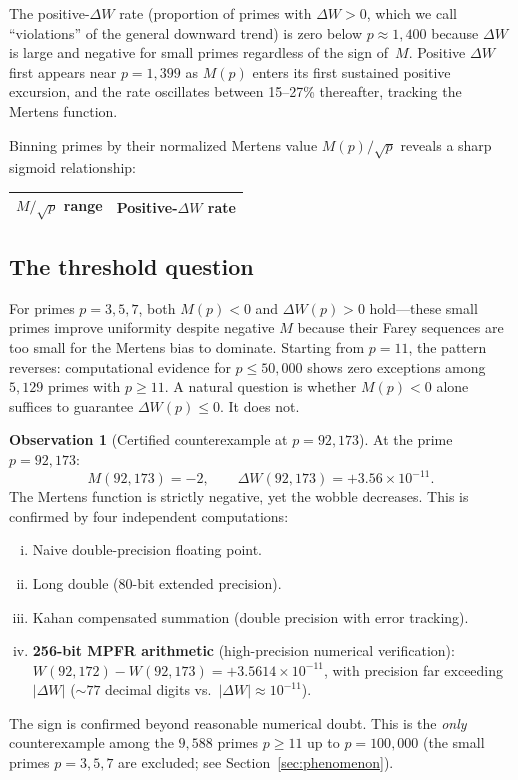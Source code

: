 \documentclass[11pt]{article}
\theoremstyle{definition}
\newtheorem{observation}[theorem]{Observation}
\begin{document}
\noindent The positive-$\Delta W$ rate (proportion of primes with
$\Delta W > 0$, which we call ``violations'' of the general
downward trend) is zero below $p \approx 1{,}400$ because
$\Delta W$ is large and negative for small primes regardless
of the sign of~$M$.  Positive $\Delta W$ first appears near
$p = 1{,}399$ as $M(p)$ enters
its first sustained positive excursion, and the rate oscillates
between 15--27\% thereafter, tracking the Mertens function.

Binning primes by their normalized Mertens value $M(p)/\sqrt{p}$
reveals a sharp sigmoid relationship:

\begin{center}
\begin{tabular}{lr}
\toprule
$M/\sqrt{p}$ range & Positive-$\Delta W$ rate \\
\midrule

\end{tabular}
\end{center}

\subsection{The threshold question}

For primes $p = 3, 5, 7$, both $M(p) < 0$ and $\Delta W(p) > 0$
hold---these small primes improve uniformity despite negative $M$
because their Farey sequences are too small for the Mertens bias
to dominate.  Starting from $p = 11$, the pattern reverses:
computational evidence for $p \le 50{,}000$ shows zero exceptions
among $5{,}129$ primes with $p \ge 11$.  A natural question is
whether $M(p) < 0$ alone suffices to guarantee $\Delta W(p) \le 0$.
It does not.

\begin{observation}[Certified counterexample at $p = 92{,}173$]
At the prime $p = 92{,}173$:
\[
  M(92{,}173) = -2, \qquad
  \Delta W(92{,}173) = +3.56 \times 10^{-11}.
\]
The Mertens function is strictly negative, yet the wobble decreases.
This is confirmed by four independent computations:
\begin{enumerate}[(i)]
  \item Naive double-precision floating point.
  \item Long double (80-bit extended precision).
  \item Kahan compensated summation (double precision with error tracking).
  \item \textbf{256-bit MPFR arithmetic} (high-precision numerical verification):
    $W(92{,}172) - W(92{,}173) = +3.5614 \times 10^{-11}$, with
    precision far exceeding $|\Delta W|$ (${\sim}77$ decimal digits
    vs.\ $|\Delta W| \approx 10^{-11}$).
\end{enumerate}
The sign is confirmed beyond reasonable numerical doubt.
This is the \emph{only} counterexample among the $9{,}588$ primes
$p \ge 11$ up to $p = 100{,}000$ (the small primes $p = 3, 5, 7$
are excluded; see Section~\ref{sec:phenomenon}).
\end{observation}
\end{document}
